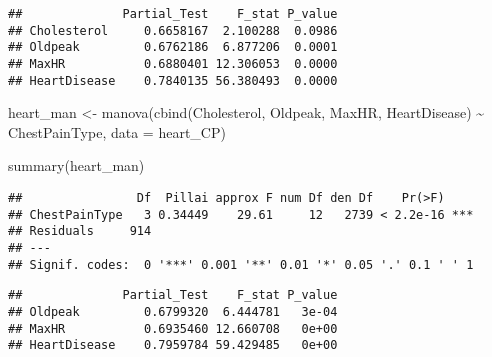 \documentclass[
]{article}
\newenvironment{Shaded}{\begin{snugshade}}{\end{snugshade}}
\newcommand{\AttributeTok}[1]{\textcolor[rgb]{0.77,0.63,0.00}{#1}}
\newcommand{\CommentTok}[1]{\textcolor[rgb]{0.56,0.35,0.01}{\textit{#1}}}
\newcommand{\FunctionTok}[1]{\textcolor[rgb]{0.00,0.00,0.00}{#1}}
\newcommand{\NormalTok}[1]{#1}
\newcommand{\OtherTok}[1]{\textcolor[rgb]{0.56,0.35,0.01}{#1}}
\newcommand{\SpecialCharTok}[1]{\textcolor[rgb]{0.00,0.00,0.00}{#1}}
\begin{document}
\begin{verbatim}
##              Partial_Test    F_stat P_value
## Cholesterol     0.6658167  2.100288  0.0986
## Oldpeak         0.6762186  6.877206  0.0001
## MaxHR           0.6880401 12.306053  0.0000
## HeartDisease    0.7840135 56.380493  0.0000
\end{verbatim}

\begin{Shaded}
\begin{Highlighting}[]
\NormalTok{heart\_man }\OtherTok{\textless{}{-}} \FunctionTok{manova}\NormalTok{(}\FunctionTok{cbind}\NormalTok{(Cholesterol, Oldpeak, MaxHR, HeartDisease) }\SpecialCharTok{\textasciitilde{}}\NormalTok{ ChestPainType,}
    \AttributeTok{data =}\NormalTok{ heart\_CP)}

\FunctionTok{summary}\NormalTok{(heart\_man)}
\end{Highlighting}
\end{Shaded}

\begin{verbatim}
##                Df  Pillai approx F num Df den Df    Pr(>F)    
## ChestPainType   3 0.34449    29.61     12   2739 < 2.2e-16 ***
## Residuals     914                                             
## ---
## Signif. codes:  0 '***' 0.001 '**' 0.01 '*' 0.05 '.' 0.1 ' ' 1
\end{verbatim}

\begin{Shaded}
\end{Shaded}

\begin{verbatim}
##              Partial_Test    F_stat P_value
## Oldpeak         0.6799320  6.444781   3e-04
## MaxHR           0.6935460 12.660708   0e+00
## HeartDisease    0.7959784 59.429485   0e+00
\end{verbatim}
\end{document}
